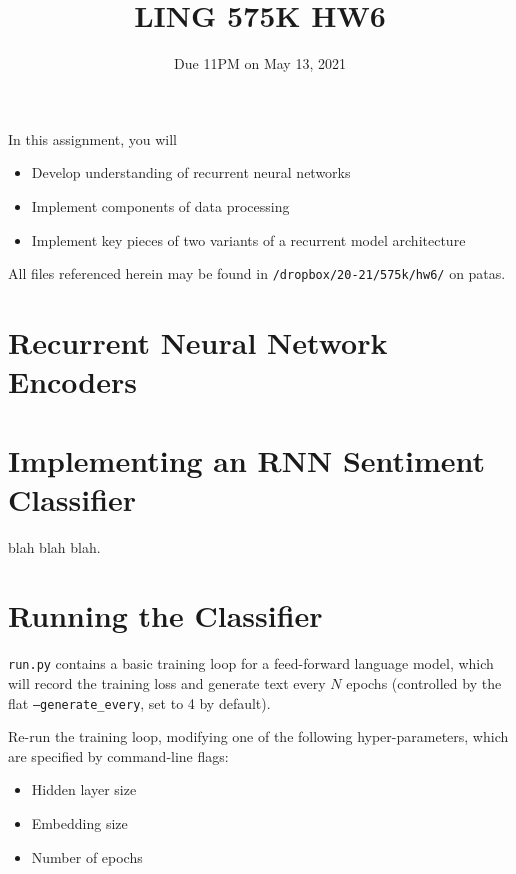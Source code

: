 \documentclass[11pt]{article}
\begin{document}
\title{LING 575K HW6}
\date{\vspace{-0.2in}Due 11PM on May 13, 2021}
\maketitle


\noindent In this assignment, you will 
\begin{itemize}
  \item Develop understanding of recurrent neural networks
  \item Implement components of data processing 
  \item Implement key pieces of two variants of a recurrent model architecture
\end{itemize}
All files referenced herein may be found in \texttt{/dropbox/20-21/575k/hw6/} on patas.


\section{Recurrent Neural Network Encoders}



\section{Implementing an RNN Sentiment Classifier}

blah blah blah.

\vspace{2em}



\section{Running the Classifier}

\texttt{run.py} contains a basic training loop for a feed-forward language model, which will record the training loss and generate text every $N$ epochs (controlled by the flat \texttt{--generate\_every}, set to 4 by default).

\vspace{2em}

\vspace{2em}

\vspace{2em}
 Re-run the training loop, modifying one of the following hyper-parameters, which are specified by command-line flags:
\begin{itemize}
  \item Hidden layer size
  \item Embedding size
  \item Number of epochs
\end{itemize}
\end{document}
